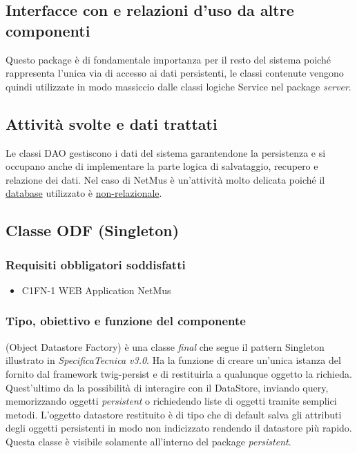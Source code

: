 \subsection*{Interfacce con e
relazioni d'uso da altre componenti} Questo package \`e di fondamentale importanza per il resto del sistema poich\'e
rappresenta l'unica via di accesso ai dati persistenti, le classi contenute
vengono quindi utilizzate in modo massiccio dalle classi logiche Service nel
package \emph{server}.
\subsection*{Attivit\`a svolte e dati trattati}
Le classi DAO gestiscono i dati del sistema garantendone la persistenza e si
occupano anche di implementare la parte logica di salvataggio, recupero e
relazione dei dati. Nel caso di NetMus \`e un'attivit\`a molto delicata poich\'e il
\underline{database} utilizzato \`e \underline{non-relazionale}.

\subsection{Classe ODF (Singleton)}
\subsubsection*{Requisiti obbligatori soddisfatti}
\begin{itemize}
    \item C1FN-1 WEB Application NetMus
\end{itemize}
\subsubsection*{Tipo, obiettivo e funzione del componente}
 (Object Datastore Factory) \`e una classe \emph{final} che segue il
pattern Singleton illustrato in \emph{SpecificaTecnica v3.0}. Ha la funzione di creare un'unica istanza del
 fornito dal framework twig-persist e di restituirla a
qualunque oggetto la richieda. Quest'ultimo da la possibilit\`a di interagire con il DataStore, inviando query, memorizzando oggetti \emph{persistent} o richiedendo liste di oggetti
tramite semplici metodi. L'oggetto datastore restituito \`e di tipo
 che di default salva gli attributi degli oggetti
persistenti in modo non indicizzato rendendo il datastore pi\`u rapido.\\
Questa classe \`e visibile solamente all'interno del package \emph{persistent}.
